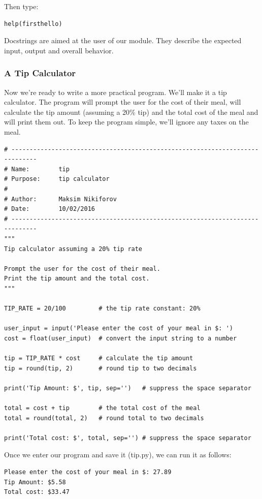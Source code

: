 \documentclass{article}
\begin{document}
Then type:
\begin{lstlisting}
help(firsthello)
\end{lstlisting}

Docstrings are aimed at the user of our module.  They describe the expected input, output and overall behavior.

\subsubsection{A Tip Calculator}

Now we're ready to write a more practical program.   We'll make it a tip calculator.  The program will prompt the user for the cost of their meal, will calculate the tip amount (assuming a 20\% tip) and the total cost of the meal and will print them out.  To keep the program simple, we'll ignore any taxes on the meal.

\begin{lstlisting}
# -----------------------------------------------------------------------------
# Name:        tip
# Purpose:     tip calculator
#
# Author:      Maksim Nikiforov
# Date:        10/02/2016
# -----------------------------------------------------------------------------
"""
Tip calculator assuming a 20% tip rate
 
Prompt the user for the cost of their meal.
Print the tip amount and the total cost.
"""
 
TIP_RATE = 20/100         # the tip rate constant: 20%
 
user_input = input('Please enter the cost of your meal in $: ')
cost = float(user_input)  # convert the input string to a number
 
tip = TIP_RATE * cost     # calculate the tip amount
tip = round(tip, 2)       # round tip to two decimals
 
print('Tip Amount: $', tip, sep='')   # suppress the space separator
 
total = cost + tip        # the total cost of the meal
total = round(total, 2)   # round total to two decimals
 
print('Total cost: $', total, sep='') # suppress the space separator

 \end{lstlisting}

Once we enter our program and save it (tip.py), we can run it as follows:

\begin{lstlisting}
Please enter the cost of your meal in $: 27.89
Tip Amount: $5.58
Total cost: $33.47

\end{lstlisting}
\end{document}
